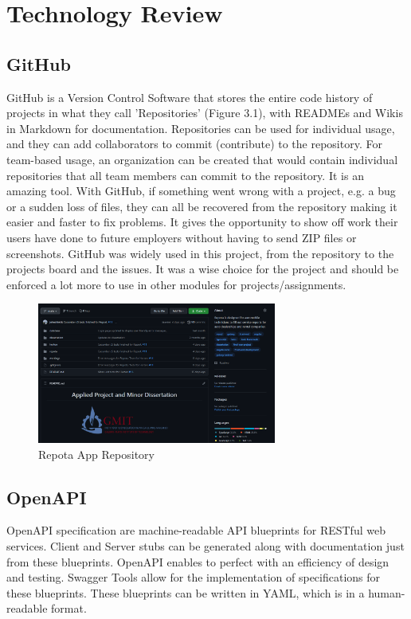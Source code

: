 \chapter{Technology Review}

\section{GitHub}
GitHub is a Version Control Software that stores the entire code history of projects in what they call 'Repositories' (Figure 3.1), with READMEs and Wikis in Markdown for documentation. Repositories can be used for individual usage, and they can add collaborators to commit (contribute) to the repository. For team-based usage, an organization can be created that would contain individual repositories that all team members can commit to the repository. It is an amazing tool. With GitHub, if something went wrong with a project, e.g. a bug or a sudden loss of files, they can all be recovered from the repository making it easier and faster to fix problems. It gives the opportunity to show off work their users have done to future employers without having to send ZIP files or screenshots. GitHub was widely used in this project, from the repository to the projects board and the issues. It was a wise choice for the project and should be enforced a lot more to use in other modules for projects/assignments.

\begin{figure}[H]
    \caption{Repota App Repository}
    \label{image:gitRepo}
    \centering
    \includegraphics[width=0.7\textwidth]{images/misc/git-repo.png}
\end{figure}

\section{OpenAPI}
OpenAPI specification are machine-readable API blueprints for RESTful web services. Client and Server stubs can be generated along with documentation just from these blueprints. OpenAPI enables to perfect with an efficiency of design and testing. Swagger Tools allow for the implementation of specifications for these blueprints. These blueprints can be written in YAML, which is in a human-readable format. 


